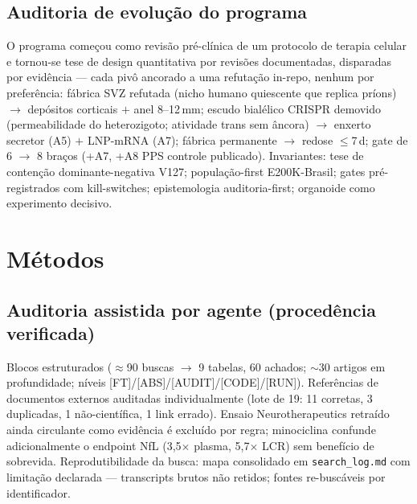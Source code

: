 \documentclass[10pt,twocolumn]{article}
\begin{document}
\subsection{Auditoria de evolução do programa}
O programa começou como revisão pré-clínica de um protocolo de terapia celular e tornou-se tese de design quantitativa por revisões documentadas, disparadas por evidência --- cada pivô ancorado a uma refutação in-repo, nenhum por preferência: fábrica SVZ refutada (nicho humano quiescente que replica príons) $\to$ depósitos corticais $+$ anel 8--12\,mm; escudo bialélico CRISPR demovido (permeabilidade do heterozigoto; atividade trans sem âncora) $\to$ enxerto secretor (A5) $+$ LNP-mRNA (A7); fábrica permanente $\to$ redose $\le$7\,d; gate de 6 $\to$ 8 braços (+A7, +A8 PPS controle publicado). Invariantes: tese de contenção dominante-negativa V127; população-first E200K-Brasil; gates pré-registrados com kill-switches; epistemologia auditoria-first; organoide como experimento decisivo.

\section{Métodos}
\subsection{Auditoria assistida por agente (procedência verificada)}
Blocos estruturados ($\approx$90 buscas $\to$ 9 tabelas, 60 achados; $\sim$30 artigos em profundidade; níveis [FT]/[ABS]/[AUDIT]/[CODE]/[RUN]). Referências de documentos externos auditadas individualmente (lote de 19: 11 corretas, 3 duplicadas, 1 não-científica, 1 link errado). Ensaio Neurotherapeutics retraído ainda circulante como evidência é excluído por regra; minociclina confunde adicionalmente o endpoint NfL (3,5$\times$ plasma, 5,7$\times$ LCR) sem benefício de sobrevida. Reprodutibilidade da busca: mapa consolidado em \texttt{search\_log.md} com limitação declarada --- transcripts brutos não retidos; fontes re-buscáveis por identificador.
\end{document}

